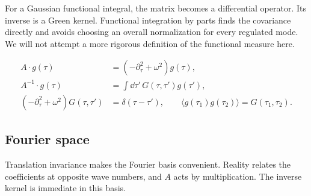 For a Gaussian functional integral, the matrix becomes a differential operator. Its inverse is a Green kernel. Functional integration by parts finds the covariance directly and avoids choosing an overall normalization for every regulated mode. We will not attempt a more rigorous definition of the functional measure here.

\begin{align}
  A\cdot g(\tau)&=(-\partial_\tau^2+\omega^2)g(\tau),
  \label{eq:253a-ch02-functional-operator}\\
  A^{-1}\cdot g(\tau)&=\int \dd\tau'\,G(\tau,\tau')g(\tau'),
  \label{eq:253a-ch02-functional-inverse}\\
  (-\partial_\tau^2+\omega^2)G(\tau,\tau')&=\delta(\tau-\tau'),
  \qquad
  \langle g(\tau_1)g(\tau_2)\rangle=G(\tau_1,\tau_2).
  \label{eq:253a-ch02-functional-covariance}
\end{align}

\subsection{Fourier space}

Translation invariance makes the Fourier basis convenient. Reality relates the coefficients at opposite wave numbers, and $A$ acts by multiplication. The inverse kernel is immediate in this basis.

